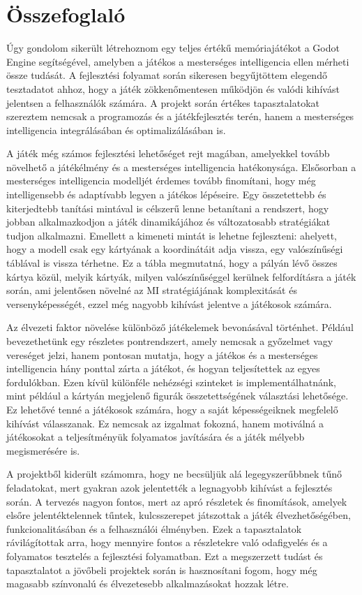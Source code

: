 \chapter{Összefoglaló}

\thispagestyle{fancy}
\pagestyle{fancy}
Úgy gondolom sikerült létrehoznom egy teljes értékű memóriajátékot a Godot Engine segítségével, amelyben a játékos a mesterséges intelligencia ellen mérheti össze tudását. 
A fejlesztési folyamat során sikeresen begyűjtöttem elegendő tesztadatot ahhoz, hogy a játék zökkenőmentesen működjön és valódi kihívást jelentsen a felhasználók számára. 
A projekt során értékes tapasztalatokat szereztem nemcsak a programozás és a játékfejlesztés terén, hanem a mesterséges intelligencia integrálásában és optimalizálásában is.

A játék még számos fejlesztési lehetőséget rejt magában, amelyekkel tovább növelhető a játékélmény és a mesterséges intelligencia hatékonysága. 
Elsősorban a mesterséges intelligencia modelljét érdemes tovább finomítani, hogy még intelligensebb és adaptívabb legyen a játékos lépéseire. 
Egy összetettebb és kiterjedtebb tanítási mintával is célszerű lenne betanítani a rendszert, hogy jobban alkalmazkodjon a játék dinamikájához és változatosabb stratégiákat tudjon alkalmazni. 
Emellett a kimeneti mintát is lehetne fejleszteni: ahelyett, hogy a modell csak egy kártyának a koordinátáit adja vissza, egy valószínűségi táblával is vissza térhetne.
Ez a tábla megmutatná, hogy a pályán lévő összes kártya közül, melyik kártyák, milyen valószínűséggel kerülnek felfordításra a játék során, ami jelentősen növelné az MI stratégiájának komplexitását és versenyképességét, ezzel még nagyobb kihívást jelentve a játékosok számára.

Az élvezeti faktor növelése különböző játékelemek bevonásával történhet. 
Például bevezethetünk egy részletes pontrendszert, amely nemcsak a győzelmet vagy vereséget jelzi, hanem pontosan mutatja, hogy a játékos és a mesterséges intelligencia hány ponttal zárta a játékot, és hogyan teljesítettek az egyes fordulókban. 
Ezen kívül különféle nehézségi szinteket is implementálhatnánk, mint például a  kártyán megjelenő figurák összetettségének választási lehetősége. Ez lehetővé tenné a játékosok számára, hogy a saját képességeiknek megfelelő kihívást válasszanak. 
Ez nemcsak az izgalmat fokozná, hanem motiválná a játékosokat a teljesítményük folyamatos javítására és a játék mélyebb megismerésére is.

A projektből kiderült számomra, hogy ne becsüljük alá legegyszerűbbnek tűnő feladatokat, mert gyakran azok jelentették a legnagyobb kihívást a fejlesztés során. 
A tervezés nagyon fontos, mert az apró részletek és finomítások, amelyek elsőre jelentéktelennek tűntek, kulcsszerepet játszottak a játék élvezhetőségében, funkcionalitásában és a felhasználói élményben. 
Ezek a tapasztalatok rávilágítottak arra, hogy mennyire fontos a részletekre való odafigyelés és a folyamatos tesztelés a fejlesztési folyamatban.
Ezt a megszerzett tudást és tapasztalatot a jövőbeli projektek során is hasznosítani fogom, hogy még magasabb színvonalú és élvezetesebb alkalmazásokat hozzak létre.